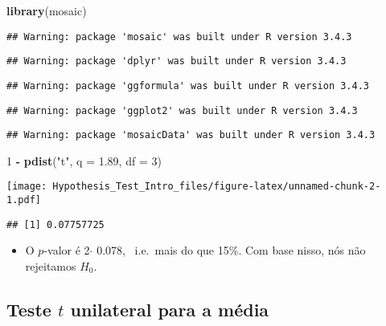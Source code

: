 \documentclass[]{article}
\newenvironment{Shaded}{\begin{snugshade}}{\end{snugshade}}
\newcommand{\KeywordTok}[1]{\textcolor[rgb]{0.13,0.29,0.53}{\textbf{#1}}}
\newcommand{\DataTypeTok}[1]{\textcolor[rgb]{0.13,0.29,0.53}{#1}}
\newcommand{\DecValTok}[1]{\textcolor[rgb]{0.00,0.00,0.81}{#1}}
\newcommand{\FloatTok}[1]{\textcolor[rgb]{0.00,0.00,0.81}{#1}}
\newcommand{\StringTok}[1]{\textcolor[rgb]{0.31,0.60,0.02}{#1}}
\newcommand{\OperatorTok}[1]{\textcolor[rgb]{0.81,0.36,0.00}{\textbf{#1}}}
\newcommand{\NormalTok}[1]{#1}
\providecommand{\tightlist}{%
  \setlength{\itemsep}{0pt}\setlength{\parskip}{0pt}}
\begin{document}
\begin{Shaded}
\begin{Highlighting}[]
\KeywordTok{library}\NormalTok{(mosaic)}
\end{Highlighting}
\end{Shaded}

\begin{verbatim}
## Warning: package 'mosaic' was built under R version 3.4.3
\end{verbatim}

\begin{verbatim}
## Warning: package 'dplyr' was built under R version 3.4.3
\end{verbatim}

\begin{verbatim}
## Warning: package 'ggformula' was built under R version 3.4.3
\end{verbatim}

\begin{verbatim}
## Warning: package 'ggplot2' was built under R version 3.4.3
\end{verbatim}

\begin{verbatim}
## Warning: package 'mosaicData' was built under R version 3.4.3
\end{verbatim}

\begin{Shaded}
\begin{Highlighting}[]
\DecValTok{1} \OperatorTok{-}\StringTok{ }\KeywordTok{pdist}\NormalTok{(}\StringTok{"t"}\NormalTok{, }\DataTypeTok{q =} \FloatTok{1.89}\NormalTok{, }\DataTypeTok{df =} \DecValTok{3}\NormalTok{)}
\end{Highlighting}
\end{Shaded}

\texttt{[image: Hypothesis\_Test\_Intro\_files/figure-latex/unnamed-chunk-2-1.pdf]}

\begin{verbatim}
## [1] 0.07757725
\end{verbatim}

\begin{itemize}
\tightlist
\item
  O \(p\)-valor é 2\(\cdot\) 0.078,~ i.e.~mais do que 15\%. Com base
  nisso, nós não rejeitamos \(H_0\).
\end{itemize}

\subsection{\texorpdfstring{Teste \(t\) unilateral para a
média}{Teste t unilateral para a média}}\label{teste-t-unilateral-para-a-media}
\end{document}
